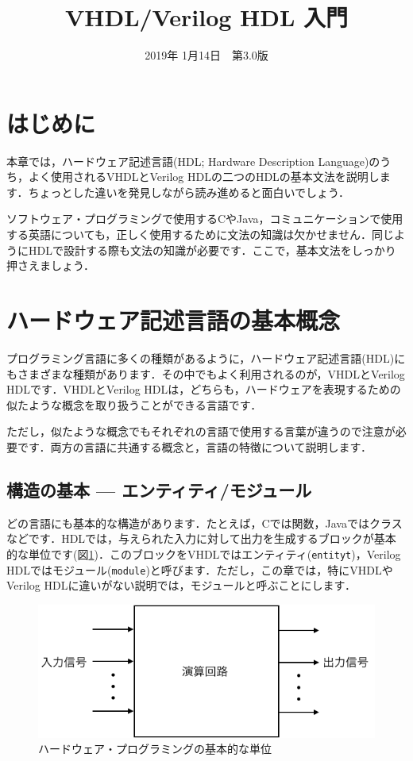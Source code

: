 \documentclass[a4paper,dvipdfmx]{jsarticle}
\begin{document}
\title{VHDL/Verilog HDL 入門}
\author{}
\date{2019年 1月14日~~第3.0版}
\maketitle

\section{はじめに}

本章では，ハードウェア記述言語(HDL; Hardware Description Language)のうち，よく使用されるVHDLとVerilog HDLの二つのHDLの基本文法を説明します．ちょっとした違いを発見しながら読み進めると面白いでしょう．

ソフトウェア・プログラミングで使用するCやJava，コミュニケーションで使用する英語についても，正しく使用するために文法の知識は欠かせません．同じようにHDLで設計する際も文法の知識が必要です．ここで，基本文法をしっかり押さえましょう．

\section{ハードウェア記述言語の基本概念}

プログラミング言語に多くの種類があるように，ハードウェア記述言語(HDL)にもさまざまな種類があります．その中でもよく利用されるのが，VHDLとVerilog HDLです．VHDLとVerilog HDLは，どちらも，ハードウェアを表現するための似たような概念を取り扱うことができる言語です．

ただし，似たような概念でもそれぞれの言語で使用する言葉が違うので注意が必要です．両方の言語に共通する概念と，言語の特徴について説明します．

\subsection{構造の基本 --- エンティティ/モジュール}

どの言語にも基本的な構造があります．たとえば，Cでは関数，Javaではクラスなどです．HDLでは，与えられた入力に対して出力を生成するブロックが基本的な単位です(図\ref{fig:design_unit})．このブロックをVHDLではエンティティ(\verb|entityt|)，Verilog HDLではモジュール(\verb|module|)と呼びます．ただし，この章では，特にVHDLやVerilog HDLに違いがない説明では，モジュールと呼ぶことにします．

 \begin{figure}[H]
  \begin{center}
   \includegraphics[width=.5\textwidth]{chapter02_figures/design_unit.png}
  \end{center}
  \caption{ハードウェア・プログラミングの基本的な単位 \label{fig:design_unit}}
 \end{figure}
\end{document}
